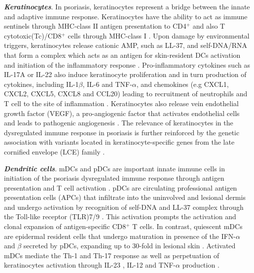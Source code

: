 \textbf{\textit{Keratinocytes}}. In psoriasis, keratinocytes represent a bridge between the innate and adaptive immune response. Keratinocytes have the ability to act as immune sentinels through MHC-class II antigen presentation to CD4$^+$ and also T cytotoxic(Tc)/CD8$^+$ cells through MHC-class I \parencite{Black2007}. Upon damage by environmental triggers, keratinocytes release cationic AMP, such as  LL-37, and self-DNA/RNA that form a complex which acts as an antigen for skin-resident DCs activation and initiation of the inflammatory response \parencite{Lande2007}. Pro-inflammatory cytokines such as IL-17A or IL-22 also induce keratinocyte proliferation and in turn production of cytokines, including IL-1$\beta$, IL-6 and TNF-$\alpha$, and chemokines (e.g CXCL1, CXCL2, CXCL5, CXCL8 and CCL20) leading to recruitment of neutrophils and T cell to the site of inflammation \parencite{Feldmeyer2007, Arend2008, Nestle2009, Nestle2005}. Keratinocytes also release vein endothelial growth factor (VEGF), a pro-angiogenic factor that activates endothelial cells and leads to pathogenic angiogenesis \parencite{Xia2003}. The relevance of keratinocytes in the dysregulated immune response in psoriasis is further reinforced by the genetic association with variants located in keratinocyte-specific genes from the late cornified envelope (LCE) family \parencite{Tsoi2012}. 




\textbf{\textit{Dendritic cells}}. mDCs and pDCs are important innate immune cells in initiation of the psoriasis dysregulated immune response through antigen presentation and T cell activation \parencite{Mahil2016}. pDCs are circulating professional antigen presentation cells (APCs) that infiltrate into the uninvolved and lesional dermis and undergo activation by recognition of self-DNA and LL-37 complex through the Toll-like receptor (TLR)7/9  \parencite{Nestle2005, Lande2007}. This activation prompts the activation and clonal expansion of antigen-specific CD8$^+$ T cells. In contrast, quiescent mDCs are epidermal resident cells that undergo maturation in presence of the IFN-$\alpha$ and $\beta$ secreted by pDCs, expanding up to 30-fold in lesional skin \parencite{Zaba2007}. Activated mDCs mediate the Th-1 and Th-17 response as well as perpetuation of keratinocytes activation through IL-23 , IL-12 and TNF-$\alpha$ production \parencite{Lee2004}. %



